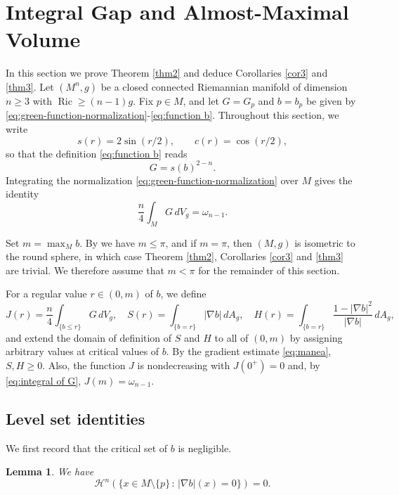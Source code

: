 \documentclass[11pt]{amsart}
\theoremstyle{plain}
\newtheorem{lemma}[theorem]{Lemma}
\numberwithin{equation}{section}
\DeclareMathOperator{\ric}{Ric}
\newcommand{\dvol}{\,dV_g}
\newcommand{\darea}{\,dA_g}
\newcommand{\bsls}{\{b\le r\}}
\newcommand{\bls}{\{b=r\}}
\begin{document}
\section{Integral Gap and Almost-Maximal Volume}
In this section we prove Theorem \ref{thm2} and deduce Corollaries \ref{cor3} and \ref{thm3}. Let $(M^n,g)$ be a closed connected Riemannian manifold of dimension $n\ge 3$ with $\ric\ge(n-1)g$. Fix $p\in M$, and let $G=G_p$ and $b=b_p$ be given by \eqref{eq:green-function-normalization}-\eqref{eq:function b}. Throughout this section, we write
\begin{equation*}
    s(r)=2\sin(r/2),\qquad c(r)=\cos(r/2),
\end{equation*}
so that the definition \eqref{eq:function b} reads
\begin{equation*}
G=s(b)^{2-n}.
\end{equation*}
Integrating the normalization \eqref{eq:green-function-normalization} over $M$ gives the identity
\begin{equation}\label{eq:integral of G}
\frac{n}{4}\int_M G\,dV_g=\omega_{n-1}.
\end{equation}

Set $m=\max_M b$. By \cite[Theorem 1.1]{Man25} we have $m\le \pi$, and if $m=\pi$, then $(M,g)$ is isometric to the round sphere, in which case Theorem \ref{thm2}, Corollaries \ref{cor3} and \ref{thm3} are trivial. We therefore assume that $m<\pi$ for the remainder of this section.

For a regular value $r\in(0,m)$ of $b$, we define 
\begin{equation}\label{eq:JSH}
J(r)=\frac{n}{4}\int_{\bsls}G\dvol,\quad S(r)=\int_{\bls}|\nabla b|\darea,\quad H(r)=\int_{\bls}\frac{1-|\nabla b|^2}{|\nabla b|}\darea,
\end{equation}
and extend the domain of definition of $S$ and $H$ to all of $(0,m)$ by assigning arbitrary values at critical values of $b$. By the gradient estimate \eqref{eq:manea}, $S,H\ge0$. Also, the function $J$ is nondecreasing with $J(0^+)=0$ and, by \eqref{eq:integral of G}, $J(m)=\omega_{n-1}$.

\subsection{Level set identities}
We first record that the critical set of $b$ is negligible.

\begin{lemma}\label{lem:critical set of b}
We have
\begin{equation*}
\mathcal H^n\left(\{x\in M\setminus\{p\}\,:\,|\nabla b|(x)=0\}\right)=0.
\end{equation*}
\end{lemma}
\end{document}
